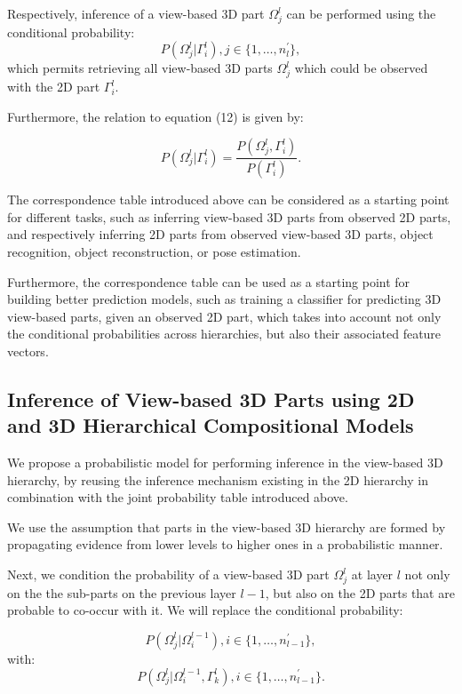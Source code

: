 \documentclass[runningheads]{llncs}
\begin{document}
Respectively, inference of a view-based 3D part $\Omega_j^l$ can be performed using the conditional probability:
\begin{equation}
 P(\Omega_j^l \vert \Gamma_i^l), j \in \{1,\dots,n_{l}^{'}\},
\end{equation} 
which permits retrieving all view-based 3D parts $\Omega_j^l$ which could be observed with the 2D part $\Gamma_i^l$. 

Furthermore, the relation to equation (12) is given by:

\begin{equation}
 P(\Omega_j^l \vert \Gamma_i^l)=\frac{P(\Omega_j^l,\Gamma_i^l)}{P(\Gamma_i^l)}.
\end{equation} 
 
The correspondence table introduced above can be considered as a starting point for different tasks, such as inferring view-based 3D parts from observed 2D parts, and respectively inferring 2D parts from observed view-based 3D parts, object recognition, object reconstruction, or pose estimation. 

Furthermore, the correspondence table can be used as a starting point for building better prediction models, such as training a classifier for predicting 3D view-based parts, given an observed 2D part, which takes into account not only the conditional probabilities across hierarchies, but also their associated feature vectors.

\subsection{Inference of View-based 3D Parts using 2D and 3D Hierarchical Compositional Models}
\label{sec:inference}

We propose a probabilistic model for performing inference in the view-based 3D hierarchy, by reusing the inference mechanism existing in the 2D hierarchy in combination with the joint probability table introduced above.

We use the assumption that parts in the view-based 3D hierarchy are formed by propagating evidence from lower levels to higher ones in a probabilistic manner. 

Next, we condition the probability of a view-based 3D part $\Omega_j^{l}$ at layer $l$ not only on the the sub-parts on the previous layer $l-1$, but also on the 2D parts that are probable to co-occur with it. We will replace the conditional probability:

\begin{equation}
 P(\Omega_j^{l} \vert \Omega_i^{l-1}), i \in \{1,\dots,n_{l-1}^{'}\},
\end{equation}
with:
\begin{equation}
 P(\Omega_j^{l} \vert \Omega_i^{l-1},\Gamma_k^l), i \in \{1,\dots,n_{l-1}^{'}\}.
\end{equation}
\end{document}
